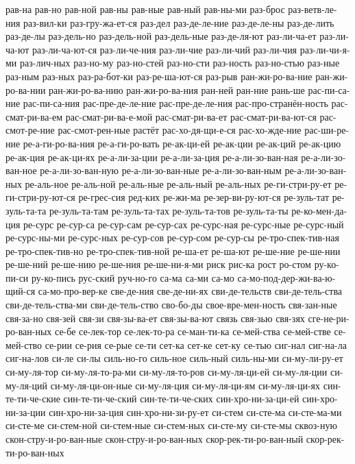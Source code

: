 {рав-на
рав-но
рав-ной
рав-ны
рав-ные
рав-ный
рав-ны-ми
раз-брос
раз-ветв-ле-ния
раз-вил-ки
раз-гру-жа-ет-ся
раз-дел
раз-де-ле-ние
раз-де-ле-ны
раз-де-лить
раз-де-лы
раз-дель-но
раз-дель-ной
раз-дель-ные
раз-де-ля-ют
раз-ли-ча-ет
раз-ли-ча-ют
раз-ли-ча-ют-ся
раз-ли-че-ния
раз-ли-чие
раз-ли-чий
раз-ли-чия
раз-ли-чи-я-ми
раз-лич-ных
раз-но-му
раз-но-стей
раз-но-сти
раз-ность
раз-но-стью
раз-ные
раз-ным
раз-ных
раз-ра-бот-ки
раз-ре-ша-ют-ся
раз-рыв
ран-жи-ро-ва-ние
ран-жи-ро-ва-нии
ран-жи-ро-ва-нию
ран-жи-ро-ва-ния
ран-ней
ран-ние
рань-ше
рас-пи-са-ние
рас-пи-са-ния
рас-пре-де-ле-ние
рас-пре-де-ле-ния
рас-про-странён-ность
рас-смат-ри-ва-ем
рас-смат-ри-ва-е-мой
рас-смат-ри-ва-ет
рас-смат-ри-ва-ют-ся
рас-смот-ре-ние
рас-смот-рен-ные
растёт
рас-хо-дя-щи-е-ся
рас-хо-жде-ние
рас-ши-ре-ние
ре-а-ги-ро-ва-ния
ре-а-ги-ро-вать
ре-ак-ци-ей
ре-ак-ции
ре-ак-ций
ре-ак-цию
ре-ак-ция
ре-ак-ци-ях
ре-а-ли-за-ции
ре-а-ли-за-ция
ре-а-ли-зо-ван-ная
ре-а-ли-зо-ван-ное
ре-а-ли-зо-ван-ную
ре-а-ли-зо-ван-ные
ре-а-ли-зо-ван-ным
ре-а-ли-зо-ван-ных
ре-аль-ное
ре-аль-ной
ре-аль-ные
ре-аль-ный
ре-аль-ных
ре-ги-стри-ру-ет
ре-ги-стри-ру-ют-ся
ре-грес-сия
ред-ких
ре-жи-ма
ре-зер-ви-ру-ют-ся
ре-зуль-тат
ре-зуль-та-та
ре-зуль-та-там
ре-зуль-та-тах
ре-зуль-та-тов
ре-зуль-та-ты
ре-ко-мен-да-ция
ре-сурс
ре-сур-са
ре-сур-сам
ре-сур-сах
ре-сурс-ная
ре-сурс-ные
ре-сурс-ный
ре-сурс-ны-ми
ре-сурс-ных
ре-сур-сов
ре-сур-сом
ре-сур-сы
ре-тро-спек-тив-ная
ре-тро-спек-тив-но
ре-тро-спек-тив-ной
ре-ша-ет
ре-ша-ют
ре-ше-ние
ре-ше-нии
ре-ше-ний
ре-ше-нию
ре-ше-ния
ре-ше-ни-я-ми
риск
рис-ка
рост
ро-стом
ру-ко-пи-си
ру-ко-пись
рус-ский
руч-но-го
са-ма
са-ми
са-мо
са-мо-под-дер-жи-ва-ю-щий-ся
са-мо-про-вер-ке
све-де-ния
све-де-ни-ях
сви-де-тельств
сви-де-тель-ства
сви-де-тель-ства-ми
сви-де-тель-ство
сво-бо-ды
свое-вре-мен-ность
свя-зан-ные
свя-за-но
свя-зей
свя-зи
свя-зы-ва-ет
свя-зы-ва-ют
связь
свя-зью
свя-зях
сге-не-ри-ро-ван-ных
се-бе
се-лек-тор
се-лек-то-ра
се-ман-ти-ка
се-мей-ства
се-мей-стве
се-мей-ство
се-рии
се-рия
се-рые
се-ти
сет-ка
сет-ке
сет-ку
се-тью
сиг-нал
сиг-на-ла
сиг-на-лов
си-ле
си-лы
силь-но-го
силь-ное
силь-ный
силь-ны-ми
си-му-ли-ру-ет
си-му-ля-тор
си-му-ля-то-ра-ми
си-му-ля-то-ров
си-му-ля-ци-ей
си-му-ля-ции
си-му-ля-ций
си-му-ля-ци-он-ные
си-му-ля-ция
си-му-ля-ци-ям
си-му-ля-ци-ях
син-те-ти-че-ские
син-те-ти-че-ский
син-те-ти-че-ских
син-хро-ни-за-ци-ей
син-хро-ни-за-ции
син-хро-ни-за-ция
син-хро-ни-зи-ру-ет
си-стем
си-сте-ма
си-сте-ма-ми
си-сте-ме
си-стем-ной
си-стем-ные
си-стем-ных
си-сте-му
си-сте-мы
сквоз-ную
скон-стру-и-ро-ван-ные
скон-стру-и-ро-ван-ных
скор-рек-ти-ро-ван-ный
скор-рек-ти-ро-ван-ных
}
